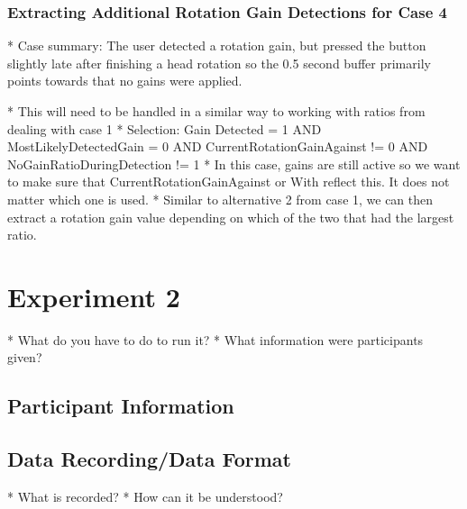 \subsubsection{Extracting Additional Rotation Gain Detections for Case 4}
  * Case summary: The user detected a rotation gain, but pressed the button slightly late after finishing a head rotation so the 0.5 second buffer primarily points towards that no gains were applied. 

  * This will need to be handled in a similar way to working with ratios from dealing with case 1
  * Selection: Gain Detected = 1 AND MostLikelyDetectedGain = 0 AND CurrentRotationGainAgainst != 0 AND NoGainRatioDuringDetection != 1
  * In this case, gains are still active so we want to make sure that CurrentRotationGainAgainst or With reflect this. It does not matter which one is used. 
  * Similar to alternative 2 from case 1, we can then extract a rotation gain value depending on which of the two that had the largest ratio.

\section{Experiment 2}
* What do you have to do to run it?
* What information were participants given?

\subsection{Participant Information}

\subsection{Data Recording/Data Format}

  * What is recorded?
  * How can it be understood?

